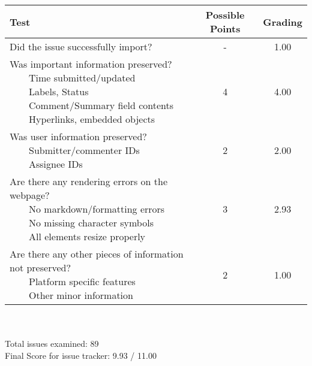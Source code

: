 \documentclass{article}
\newcommand{\tabitem}{~~\llap{\textbullet}~~}
\begin{document}
\begin{adjustbox}{center}
	\renewcommand{\arraystretch}{1.5}
	\begin{tabular}{ p{6cm} | c | c }
		Test & Possible Points & Grading \\ \hline
		Did the issue successfully import? & - & 1.00 \\
		\hline
		\makecell[l]{
			Was important information preserved? \\
			\tabitem Time submitted/updated \\
			\tabitem Labels, Status \\
			\tabitem Comment/Summary field contents \\
			\tabitem Hyperlinks, embedded objects}
		& 4 & 4.00 \\
		\hline
		\makecell[l]{
			Was user information preserved? \\
			\tabitem Submitter/commenter IDs \\
			\tabitem Assignee IDs
		} & 2 & 2.00 \\
		\hline
		\makecell[{{p{6cm}}}]{
			Are there any rendering errors on the webpage? \\
			\tabitem No markdown/formatting errors \\
			\tabitem No missing character symbols \\
			\tabitem All elements resize properly
		} & 3 & 2.93 \\
		\hline
		\makecell[{{p{6cm}}}]{
			Are there any other pieces of information not preserved? \\
			\tabitem Platform specific features \\
			\tabitem Other minor information
		} & 2 & 1.00 \\
	\end{tabular}
\end{adjustbox}
\\
\\Total issues examined: 89\\Final Score for issue tracker: 9.93 / 11.00 \\ \\\begin{adjustbox}{center}
\end{adjustbox}
\end{document}
